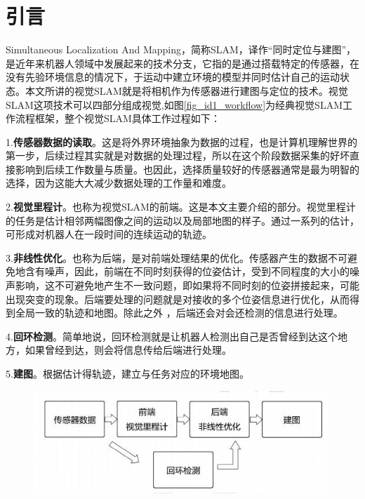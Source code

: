 \documentclass[10.5pt,twocolumn]{jbuaa}
\begin{document}
\wuhao 



\section{引言}
Simultaneous Localization And Mapping，简称SLAM，译作“同时定位与建图”，是近年来机器人领域中发展起来的技术分支，它指的是通过搭载特定的传感器，在没有先验环境信息的情况下，于运动中建立环境的模型并同时估计自己的运动状态。本文所讲的视觉SLAM就是将相机作为传感器进行建图与定位的技术。视觉SLAM这项技术可以四部分组成视觉,如图\ref{fig_id1_workflow}为经典视觉SLAM工作流程框架，整个视觉SLAM具体工作过程如下\cite{gaoxiang14slam}：

1.\textbf{传感器数据的读取}。这是将外界环境抽象为数据的过程，也是计算机理解世界的第一步，后续过程其实就是对数据的处理过程，所以在这个阶段数据采集的好坏直接影响到后续工作数量与质量。也因此，选择质量较好的传感器通常是最为明智的选择，因为这能大大减少数据处理的工作量和难度。

2.\textbf{视觉里程计}。也称为视觉SLAM的前端。这是本文主要介绍的部分。视觉里程计的任务是估计相邻两幅图像之间的运动以及局部地图的样子。通过一系列的估计，可形成对机器人在一段时间的连续运动的轨迹。

3.\textbf{非线性优化}。也称为后端，是对前端处理结果的优化。传感器产生的数据不可避免地含有噪声，因此，前端在不同时刻获得的位姿估计，受到不同程度的大小的噪声影响，这不可避免地产生不一致问题，即如果将不同时刻的位姿拼接起来，可能出现突变的现象。后端要处理的问题就是对接收的多个位姿信息进行优化，从而得到全局一致的轨迹和地图。除此之外 ，后端还会对会还检测的信息进行处理。

4.\textbf{回环检测}。简单地说，回环检测就是让机器人检测出自己是否曾经到达这个地方，如果曾经到达，则会将信息传给后端进行处理。

5.\textbf{建图}。根据估计得轨迹，建立与任务对应的环境地图。

\begin{figure}[h!]
	\centering
	\includegraphics [scale=0.45,trim=0 0 0 0]{./image/SLAM_workflow}
\end{figure}
\end{document}
